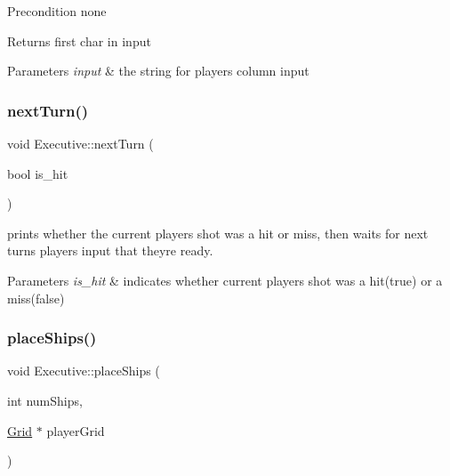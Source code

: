 \begin{DoxyPrecond}{Precondition}
none 
\end{DoxyPrecond}
\begin{DoxyReturn}{Returns}
first char in input 
\end{DoxyReturn}

\begin{DoxyParams}{Parameters}
{\em input} & the string for player\textquotesingle{}s column input \\
\hline
\end{DoxyParams}
\mbox{\label{classExecutive_ad28543f2f3aff90f695b7cbe1cdaac3e}} 
\subsubsection{\texorpdfstring{next\+Turn()}{nextTurn()}}
{\footnotesize\ttfamily void Executive\+::next\+Turn (\begin{DoxyParamCaption}\item[{bool}]{is\+\_\+hit }\end{DoxyParamCaption})}



prints whether the current player\textquotesingle{}s shot was a hit or miss, then waits for next turn\textquotesingle{}s player\textquotesingle{}s input that they\textquotesingle{}re ready. 


\begin{DoxyParams}{Parameters}
{\em is\+\_\+hit} & indicates whether current player\textquotesingle{}s shot was a hit(true) or a miss(false) \\
\hline
\end{DoxyParams}
\mbox{\label{classExecutive_acff54f6827b9b21462c8c5d7fad93a13}} 
\subsubsection{\texorpdfstring{place\+Ships()}{placeShips()}}
{\footnotesize\ttfamily void Executive\+::place\+Ships (\begin{DoxyParamCaption}\item[{int}]{num\+Ships,  }\item[{\hyperlink{classGrid}{Grid} $\ast$}]{player\+Grid }\end{DoxyParamCaption})}



